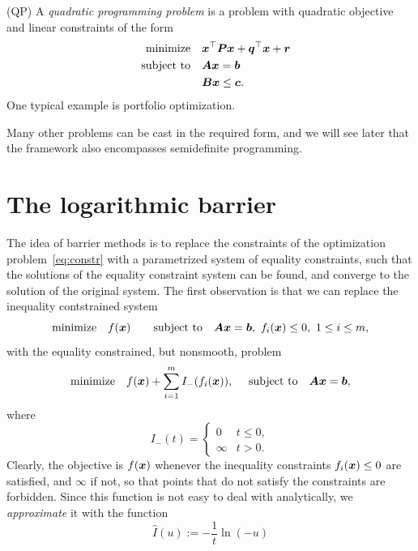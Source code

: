 \begin{example}(QP) A {\em quadratic programming problem} is a problem with quadratic objective and linear constraints of the form
\begin{align*}
 \text{minimize}\quad & \bm{x}^{\top}\bm{P}\bm{x}+\bm{q}^{\top}\bm{x}+\bm{r}\\
 \quad\text{subject to}\quad & \bm{A}\bm{x}=\bm{b}\\
 & \bm{B}\bm{x}\leq \bm{c}.
\end{align*}
One typical example is portfolio optimization.
\end{example}

Many other problems can be cast in the required form, and we will see later that the framework also encompasses semidefinite programming.

\section{The logarithmic barrier}
The idea of barrier methods is to replace the constraints of the optimization problem~\eqref{eq:constr} with a parametrized system of equality constraints, such that the solutions of the equality constraint system can be found, and converge to the solution of the original system. The first observation is that we can replace the inequality contstrained system
\begin{equation*}
 \text{minimize}\quad f(\bm{x}) \quad \quad\text{subject to}\quad \bm{A}\bm{x}=\bm{b}, \ f_i(\bm{x})\leq 0, \ 1\leq i\leq m,
\end{equation*}
with the equality constrained, but nonsmooth, problem
\begin{equation*}
 \text{minimize}\quad f(\bm{x}) + \sum_{i=1}^m I_-(f_i(\bm{x})), \ \quad\text{subject to}\quad \bm{A}\bm{x}=\bm{b},
\end{equation*}
where
\begin{equation*}
 I_-(t) = \begin{cases}
           0 & t\leq 0,\\
           \infty & t>0.
          \end{cases}
\end{equation*}
Clearly, the objective is $f(\bm{x})$ whenever the inequality constraints $f_i(\bm{x})\leq 0$ are satisfied, and $\infty$ if not, so that points that do not satisfy the constraints are forbidden. Since this function is not easy to deal with analytically, we {\em approximate} it with the function
\begin{equation*}
 \hat{I}(u) := -\frac{1}{t}\ln(-u)
\end{equation*}
